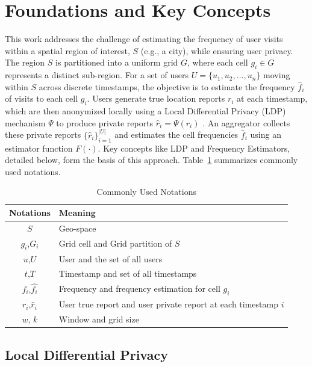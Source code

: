 \section{Foundations and Key Concepts}
\label{sec:background}

This work addresses the challenge of estimating the frequency of user visits within a spatial region of interest, $S$ (e.g., a city), while ensuring user privacy. The region $S$ is partitioned into a uniform grid $G$, where each cell $g_{i} \in G$ represents a distinct sub-region. For a set of users $U=\{u_{1}, u_{2}, ..., u_{n}\}$ moving within $S$ across discrete timestamps, the objective is to estimate the frequency $\hat{f}_{i}$ of visits to each cell $g_{i}$. Users generate true location reports $r_{i}$ at each timestamp, which are then anonymized locally using a Local Differential Privacy (LDP) mechanism $\Psi$ to produce private reports $\hat{r}_{i}=\Psi(r_{i})$ \cite{Filho2023FELIP}. An aggregator collects these private reports $\{\hat{r}_{i}\}_{i=1}^{|U|}$ and estimates the cell frequencies $\hat{f}_{i}$ using an estimator function $F(\cdot)$. Key concepts like LDP and Frequency Estimators, detailed below, form the basis of this approach. Table~\ref{tab:notations} summarizes commonly used notations. 

\begin{table}[tb]
  \caption{Commonly Used Notations}
  \begin{tabular}{cp{5.9cm}}
    \toprule
    Notations&Meaning\\
    \midrule
    $S$ & Geo-space \\
    $g_i$,$G_i$ & Grid cell and Grid partition of $S$\\
    $u$,$U$ & User and the set of all users \\
    $t$,$T$ & Timestamp and set of all timestamps \\
    $f_i$,$\hat{f_i}$ & Frequency and frequency estimation for cell $g_i$\\
    $r_i$,$\hat{r}_i$ & User true report and user private report at each timestamp $i$ \looseness=-1\\
    $w$, $k$ & Window and grid size\\
  \bottomrule
\end{tabular}
\label{tab:notations}
\end{table}

\subsection{Local Differential Privacy}


